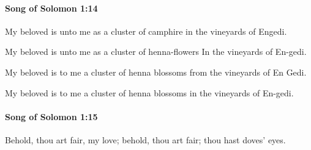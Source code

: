		\paragraph{Song of Solomon 1:14} %
			\label{SONGOFSOLOMON-1-14}

			My beloved is unto me as a cluster of camphire in the vineyards of Engedi.

			\begin{versebox}
					\item[BHS] 
					\item[LXX] 
					\item[ASV] My beloved is unto me as a cluster of henna-flowers In the vineyards of En-gedi.
					\item[NIV] My beloved is to me a cluster of henna blossoms from the vineyards of En Gedi.
					\item[NRSV] My beloved is to me a cluster of henna blossoms in the vineyards of En-gedi.
			\end{versebox}

		\paragraph{Song of Solomon 1:15} %
			\label{SONGOFSOLOMON-1-15}

			Behold, thou art fair, my love; behold, thou art fair; thou hast doves’ eyes.

